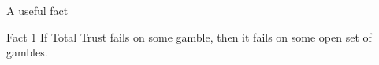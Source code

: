 \documentclass[aspectratio=169, dvipsnames]{beamer}
\newcommand{\E}{\mathbb{E}}
\begin{document}


\begin{frame}{A useful fact}
  \begin{block}{Fact 1}
    If Total Trust fails on some gamble, then it fails on some open set of gambles.
  \end{block}
\end{frame}
\end{document}
